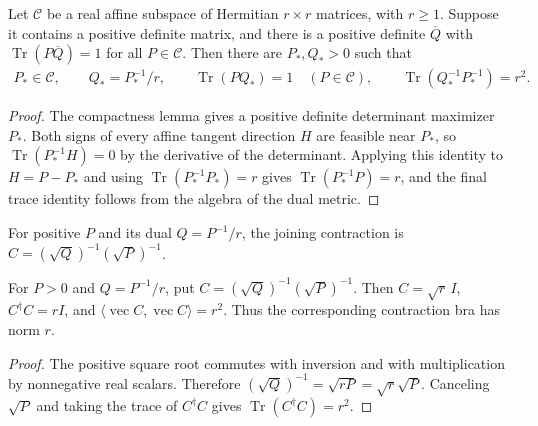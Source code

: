 \begin{lemma}
    \label{thm:mpu_affine_gram_balancing}
    \leanok
    Let $\mathcal C$ be a real affine subspace of Hermitian $r\times r$
    matrices, with $r\geq1$. Suppose it contains a positive definite matrix, and
    there is a positive definite $\overline Q$ with
    $\operatorname{Tr}(P\overline Q)=1$ for all $P\in\mathcal C$.
    Then there are $P_*,Q_*>0$ such that
    \begin{align}
        P_*\in\mathcal C,\qquad
        Q_*=P_*^{-1}/r,\qquad
        \operatorname{Tr}(PQ_*)=1\quad(P\in\mathcal C),\qquad
        \operatorname{Tr}(Q_*^{-1}P_*^{-1})=r^2.
    \end{align}
\end{lemma}
\begin{proof}\leanok
    The compactness lemma gives a positive definite determinant
    maximizer $P_*$. Both signs of every affine
    tangent direction $H$ are feasible near $P_*$, so
    $\operatorname{Tr}(P_*^{-1}H)=0$ by the derivative of the determinant.
    Applying this identity to $H=P-P_*$ and using
    $\operatorname{Tr}(P_*^{-1}P_*)=r$ gives $\operatorname{Tr}(P_*^{-1}P)=r$, and the final trace identity
    follows from the algebra of the dual metric.
\end{proof}

\begin{definition}
    \label{def:mpu_balanced_gram_contraction}
    \leanok
    For positive $P$ and its dual $Q=P^{-1}/r$, the joining
    contraction is $C=(\sqrt Q)^{-1}(\sqrt P)^{-1}$.
\end{definition}

\begin{lemma}
    \label{thm:mpu_balanced_gram_contraction}
    \leanok
    For $P>0$ and $Q=P^{-1}/r$, put
    $C=(\sqrt Q)^{-1}(\sqrt P)^{-1}$. Then
    $C=\sqrt r\,I$, $C^\dagger C=rI$, and
    $\langle\operatorname{vec}C,\operatorname{vec}C\rangle=r^2$.
    Thus the corresponding contraction bra has norm $r$.
\end{lemma}
\begin{proof}\leanok
    The positive square root commutes with inversion and with
    multiplication by nonnegative real scalars. Therefore
    $(\sqrt Q)^{-1}=\sqrt{rP}=\sqrt r\sqrt P$.
    Canceling $\sqrt P$ and taking the trace of $C^\dagger C$ gives $\operatorname{Tr}(C^\dagger C)=r^2$.
\end{proof}

